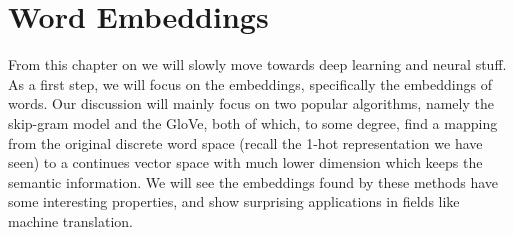 \documentclass[../main.tex]{subfiles}
\begin{document}

\chapter{Word Embeddings}
From this chapter on we will slowly move towards deep learning and neural stuff. As a first step, we will focus on the embeddings, specifically the embeddings of words. Our discussion will mainly focus on two popular algorithms, namely the skip-gram model and the GloVe, both of which, to some degree, find a mapping from the original discrete word space (recall the 1-hot representation we have seen) to a continues vector space with much lower dimension which keeps the semantic information. We will see the embeddings found by these methods have some interesting properties, and show surprising applications in fields like machine translation.
\end{document}
